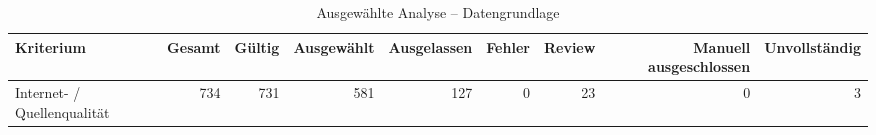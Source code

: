 \begin{table}[htbp]
\centering
\caption{Ausgewählte Analyse -- Datengrundlage}
\begin{tabular}{lrrrrrrrr}
\toprule
Kriterium & Gesamt & Gültig & Ausgewählt & Ausgelassen & Fehler & Review & Manuell ausgeschlossen & Unvollständig \\
\midrule
Internet- / Quellenqualität & 734 & 731 & 581 & 127 & 0 & 23 & 0 & 3 \\
\bottomrule
\end{tabular}
\end{table}

